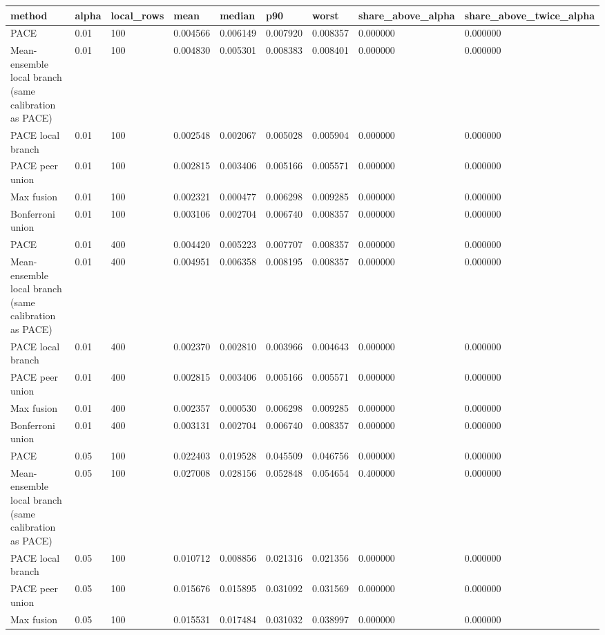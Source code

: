 \begin{tabular}{lllllllll}
\toprule
method & alpha & local\_rows & mean & median & p90 & worst & share\_above\_alpha & share\_above\_twice\_alpha \\
\midrule
PACE & 0.01 & 100 & 0.004566 & 0.006149 & 0.007920 & 0.008357 & 0.000000 & 0.000000 \\
Mean-ensemble local branch (same calibration as PACE) & 0.01 & 100 & 0.004830 & 0.005301 & 0.008383 & 0.008401 & 0.000000 & 0.000000 \\
PACE local branch & 0.01 & 100 & 0.002548 & 0.002067 & 0.005028 & 0.005904 & 0.000000 & 0.000000 \\
PACE peer union & 0.01 & 100 & 0.002815 & 0.003406 & 0.005166 & 0.005571 & 0.000000 & 0.000000 \\
Max fusion & 0.01 & 100 & 0.002321 & 0.000477 & 0.006298 & 0.009285 & 0.000000 & 0.000000 \\
Bonferroni union & 0.01 & 100 & 0.003106 & 0.002704 & 0.006740 & 0.008357 & 0.000000 & 0.000000 \\
PACE & 0.01 & 400 & 0.004420 & 0.005223 & 0.007707 & 0.008357 & 0.000000 & 0.000000 \\
Mean-ensemble local branch (same calibration as PACE) & 0.01 & 400 & 0.004951 & 0.006358 & 0.008195 & 0.008357 & 0.000000 & 0.000000 \\
PACE local branch & 0.01 & 400 & 0.002370 & 0.002810 & 0.003966 & 0.004643 & 0.000000 & 0.000000 \\
PACE peer union & 0.01 & 400 & 0.002815 & 0.003406 & 0.005166 & 0.005571 & 0.000000 & 0.000000 \\
Max fusion & 0.01 & 400 & 0.002357 & 0.000530 & 0.006298 & 0.009285 & 0.000000 & 0.000000 \\
Bonferroni union & 0.01 & 400 & 0.003131 & 0.002704 & 0.006740 & 0.008357 & 0.000000 & 0.000000 \\
PACE & 0.05 & 100 & 0.022403 & 0.019528 & 0.045509 & 0.046756 & 0.000000 & 0.000000 \\
Mean-ensemble local branch (same calibration as PACE) & 0.05 & 100 & 0.027008 & 0.028156 & 0.052848 & 0.054654 & 0.400000 & 0.000000 \\
PACE local branch & 0.05 & 100 & 0.010712 & 0.008856 & 0.021316 & 0.021356 & 0.000000 & 0.000000 \\
PACE peer union & 0.05 & 100 & 0.015676 & 0.015895 & 0.031092 & 0.031569 & 0.000000 & 0.000000 \\
Max fusion & 0.05 & 100 & 0.015531 & 0.017484 & 0.031032 & 0.038997 & 0.000000 & 0.000000 \\

\end{tabular}
